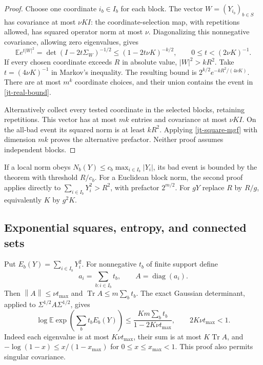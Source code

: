 \documentclass[11pt]{article}
\theoremstyle{remark}\newtheorem{remark}[theorem]{Remark}
\newcommand{\norm}[1]{\left\lVert#1\right\rVert}
\begin{document}
\begin{proof}
Choose one coordinate $i_b\in I_b$ for each block. The vector
$W=(Y_{i_b})_{b\in S}$ has covariance at most $\nu K I$:
the coordinate-selection map, with repetitions allowed, has
squared operator norm at most $\nu$. Diagonalizing this
nonnegative covariance, allowing zero eigenvalues, gives
\begin{equation}\label{jt-square-mgf}
 \mathbb E e^{t|W|^2}
 =\det(I-2t\Sigma_W)^{-1/2}
 \le(1-2t\nu K)^{-k/2},\qquad 0\le t<(2\nu K)^{-1}.
\end{equation}
If every chosen coordinate exceeds $R$ in absolute value,
$|W|^2>kR^2$. Take $t=(4\nu K)^{-1}$ in Markov's inequality.
The resulting bound is $2^{k/2}e^{-kR^2/(4\nu K)}$.
There are at most $m^k$ coordinate choices, and their union
contains the event in \eqref{jt-real-bound}.

Alternatively collect every tested coordinate in the selected
blocks, retaining repetitions. This vector has at most $mk$
entries and covariance at most $\nu K I$. On the all-bad event
its squared norm is at least $kR^2$. Applying
\eqref{jt-square-mgf} with dimension $mk$ proves the alternative
prefactor. Neither proof assumes independent blocks.
\end{proof}

If a local norm obeys
$N_b(Y)\le c_b\max_{i\in I_b}|Y_i|$, its bad event is
bounded by the theorem with threshold $R/c_b$. For a Euclidean
block norm, the second proof applies directly to
$\sum_{i\in I_b}Y_i^2>R^2$, with prefactor $2^{m/2}$.
For $gY$ replace $R$ by $R/g$, equivalently $K$ by $g^2K$.

\subsection{Exponential squares, entropy, and connected sets}
\label{jt-entropy-section}

Put $E_b(Y)=\sum_{i\in I_b}Y_i^2$. For nonnegative $t_b$ of
finite support define
\[
 a_i=\sum_{b:i\in I_b}t_b,\qquad A=\operatorname{diag}(a_i).
\]
Then $\norm A\le\nu t_{\max}$ and
$\operatorname{Tr}A\le m\sum_b t_b$. The exact Gaussian
determinant, applied to $\Sigma^{1/2}A\Sigma^{1/2}$, gives
\begin{equation}\label{jt-exponential-square}
 \boxed{\quad
 \log\mathbb E\exp\!\left(\sum_b t_bE_b(Y)\right)
 \le\frac{Km\sum_b t_b}{1-2K\nu t_{\max}},
 \qquad 2K\nu t_{\max}<1.
 \quad}
\end{equation}
Indeed each eigenvalue is at most $K\nu t_{\max}$, their
sum is at most $K\operatorname{Tr}A$, and
$-\log(1-x)\le x/(1-x_{\max})$ for $0\le x\le x_{\max}<1$.
This proof also permits singular covariance.
\end{document}
